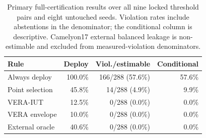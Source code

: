 \begin{table}[t]
\centering
\small
\setlength{\tabcolsep}{3.3pt}
\begin{tabular}{lrrr}
\toprule
Rule & Deploy & Viol./estimable & Conditional \\
\midrule
Always deploy & 100.0\% & 166/288 (57.6\%) & 57.6\% \\
Point selection & 45.8\% & 14/288 (4.9\%) & 9.9\% \\
VERA-IUT & 12.5\% & 0/288 (0.0\%) & 0.0\% \\
VERA envelope & 10.0\% & 0/288 (0.0\%) & 0.0\% \\
External oracle & 40.6\% & 0/288 (0.0\%) & 0.0\% \\
\bottomrule
\end{tabular}
\caption{Primary full-certification results over all nine locked threshold pairs and eight untouched seeds. Violation rates include abstentions in the denominator; the conditional column is descriptive. Camelyon17 external balanced leakage is non-estimable and excluded from measured-violation denominators.}
\label{tab:main-rules}
\end{table}
